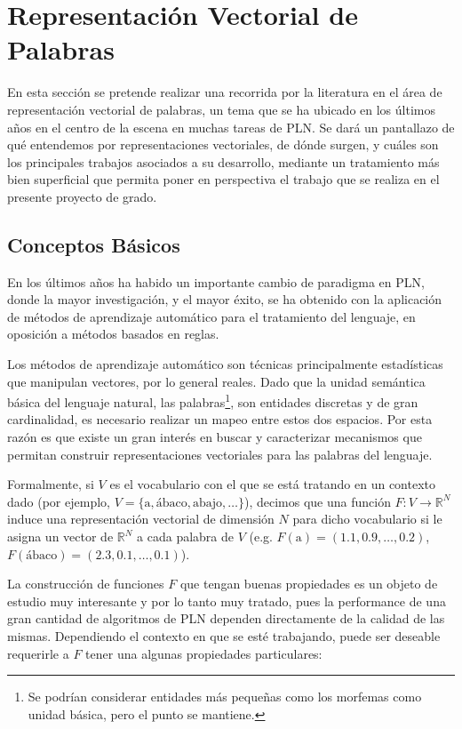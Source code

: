 \chapter{Representación Vectorial de Palabras}

En esta sección se pretende realizar una recorrida por la literatura en el área de representación
vectorial de palabras, un tema que se ha ubicado en los últimos años en el centro de la escena en
muchas tareas de PLN\@. Se dará un pantallazo de qué entendemos por representaciones vectoriales, de
dónde surgen, y cuáles son los principales trabajos asociados a su desarrollo, mediante un
tratamiento más bien superficial que permita poner en perspectiva el trabajo que se realiza en el
presente proyecto de grado.


\section{Conceptos Básicos}

En los últimos años ha habido un importante cambio de paradigma en PLN, donde la mayor
investigación, y el mayor éxito, se ha obtenido con la aplicación de métodos de aprendizaje
automático para el tratamiento del lenguaje, en oposición a métodos basados en reglas.

Los métodos de aprendizaje automático son técnicas principalmente estadísticas que manipulan
vectores, por lo general reales. Dado que la unidad semántica básica del lenguaje natural, las
palabras\footnote{Se podrían considerar entidades más pequeñas como los morfemas como unidad básica,
pero el punto se mantiene.}, son entidades discretas y de gran cardinalidad, es necesario realizar
un mapeo entre estos dos espacios. Por esta razón es que existe un gran interés en buscar y
caracterizar mecanismos que permitan construir representaciones vectoriales para las palabras del
lenguaje.

Formalmente, si $V$ es el vocabulario con el que se está tratando en un contexto dado (por ejemplo,
$V = \{ \text{a}, \text{ábaco}, \text{abajo}, \ldots \}$), decimos que una función $F: V \to
\mathbb{R}^N$ induce una representación vectorial de dimensión $N$ para dicho vocabulario si le
asigna un vector de $\mathbb{R}^N$ a cada palabra de $V$ (e.g. $F(\text{a}) = (1.1, 0.9, \ldots,
0.2)$, $F(\text{ábaco}) = (2.3, 0.1, \ldots, 0.1)$).


La construcción de funciones $F$ que tengan buenas propiedades es un objeto de estudio muy
interesante y por lo tanto muy tratado, pues la performance de una gran cantidad de algoritmos de
PLN dependen directamente de la calidad de las mismas. Dependiendo el contexto en que se esté
trabajando, puede ser deseable requerirle a $F$ tener una algunas propiedades particulares:

